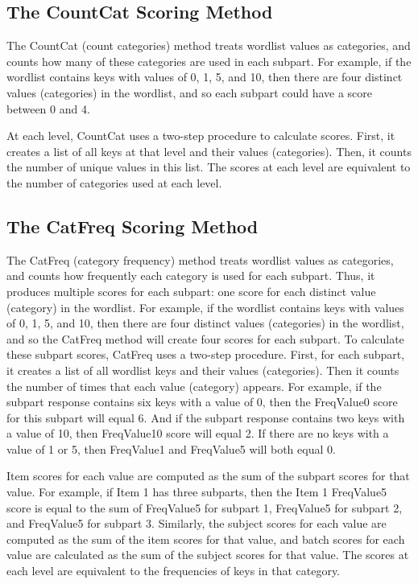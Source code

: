 \documentclass[11pt]{article}
\numberwithin{figure}{section}
\numberwithin{table}{section}
\begin{document}
\subsection{The CountCat Scoring Method}

The CountCat (count categories) method treats wordlist values as categories, and counts how many of these categories are used in each subpart.  For example, if the wordlist contains keys with values of 0, 1, 5, and 10, then there are four distinct values (categories) in the wordlist, and so each subpart could have a score between 0 and 4.

At each level, CountCat uses a two-step procedure to calculate scores.  First, it creates a list of all keys at that level and their values (categories).  Then, it counts the number of unique values in this list.   The scores at each level are equivalent to the number of categories used at each level.
 

\subsection{The CatFreq Scoring Method}

The CatFreq (category frequency) method treats wordlist values as categories, and counts how frequently each category is used for each subpart. Thus, it produces multiple scores for each subpart: one score for each distinct value (category) in the wordlist.  For example, if the wordlist contains keys with values of 0, 1, 5, and 10, then there are four distinct values (categories) in the wordlist, and so the CatFreq method will create four scores for each subpart.  To calculate these subpart scores, CatFreq uses a two-step procedure.  First, for each subpart, it creates a list of all wordlist keys and their values (categories).  Then it counts the number of times that each value (category) appears.  For example, if the subpart response contains six keys with a value of 0, then the FreqValue0 score for this subpart will equal 6.  And if the subpart response contains two keys with a value of 10, then FreqValue10 score will equal 2.  If there are no keys with a value of 1 or 5, then FreqValue1 and FreqValue5 will both equal 0.  

Item scores for each value are computed as the sum of the subpart scores for that value.  For example, if Item 1 has three subparts, then the Item 1 FreqValue5 score is equal to the sum of FreqValue5 for subpart 1, FreqValue5 for subpart 2, and FreqValue5 for subpart 3.  Similarly, the subject scores for each value are computed as the sum of the item scores for that value, and batch scores for each value are calculated as the sum of the subject scores for that value.  The scores at each level are equivalent to the frequencies of keys in that category.
\end{document}
